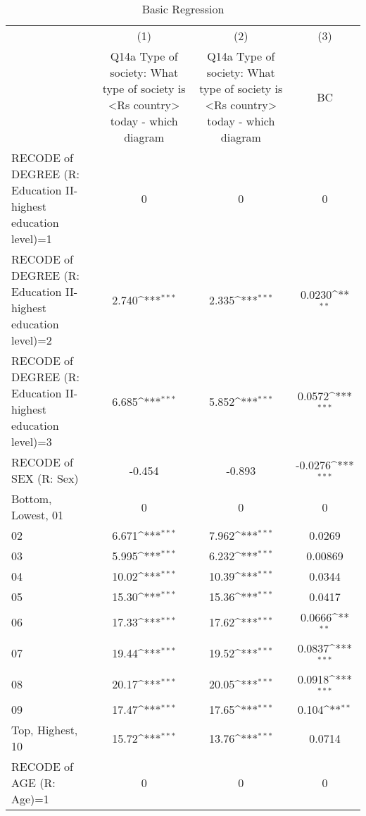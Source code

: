 \begin{table}[htbp]\centering
\def\sym#1{\ifmmode^{#1}\else\(^{#1}\)\fi}
\caption{Basic Regression\label{reg1}}
\begin{tabular}{l*{3}{c}}
\hline\hline
                    &\multicolumn{1}{c}{(1)}&\multicolumn{1}{c}{(2)}&\multicolumn{1}{c}{(3)}\\
                    &\multicolumn{1}{c}{Q14a Type of society: What type of society is <Rs country> today - which diagram}&\multicolumn{1}{c}{Q14a Type of society: What type of society is <Rs country> today - which diagram}&\multicolumn{1}{c}{BC}\\
\hline
RECODE of DEGREE (R: Education II-highest education level)=1&           0         &           0         &           0         \\
RECODE of DEGREE (R: Education II-highest education level)=2&       2.740\sym{***}&       2.335\sym{***}&      0.0230\sym{**} \\
RECODE of DEGREE (R: Education II-highest education level)=3&       6.685\sym{***}&       5.852\sym{***}&      0.0572\sym{***}\\
RECODE of SEX (R: Sex)&      -0.454         &      -0.893         &     -0.0276\sym{***}\\
Bottom, Lowest, 01  &           0         &           0         &           0         \\
02                  &       6.671\sym{***}&       7.962\sym{***}&      0.0269         \\
03                  &       5.995\sym{***}&       6.232\sym{***}&     0.00869         \\
04                  &       10.02\sym{***}&       10.39\sym{***}&      0.0344         \\
05                  &       15.30\sym{***}&       15.36\sym{***}&      0.0417         \\
06                  &       17.33\sym{***}&       17.62\sym{***}&      0.0666\sym{**} \\
07                  &       19.44\sym{***}&       19.52\sym{***}&      0.0837\sym{***}\\
08                  &       20.17\sym{***}&       20.05\sym{***}&      0.0918\sym{***}\\
09                  &       17.47\sym{***}&       17.65\sym{***}&       0.104\sym{**} \\
Top, Highest, 10    &       15.72\sym{***}&       13.76\sym{***}&      0.0714         \\
RECODE of AGE (R: Age)=1&           0         &           0         &           0         \\

\end{tabular}
\end{table}
